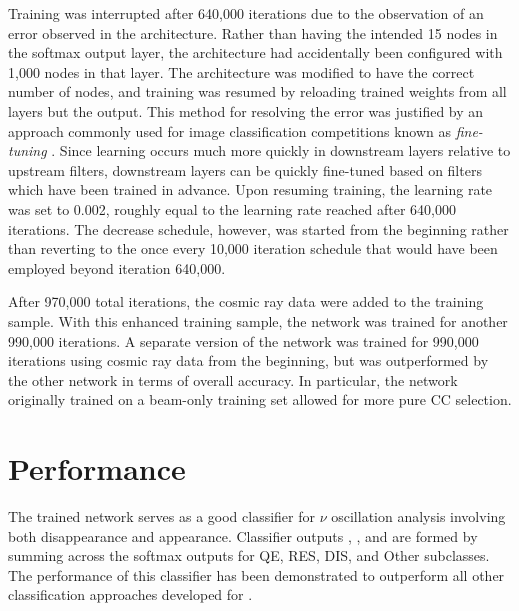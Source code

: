 Training was interrupted after 640,000 iterations due to the observation
of an error observed in the architecture.
Rather than having the intended 15 nodes in the softmax output layer,
the architecture had accidentally been configured with 1,000 nodes in that
layer.
The architecture was modified to have the correct number of nodes, and training
was resumed by reloading trained weights from all layers but the output.
This method for resolving the error was justified by an approach
commonly used for image classification competitions known as
\textit{fine-tuning} \cite{krizhevsky2012imagenet}.
Since learning occurs much more quickly in downstream layers relative to
upstream filters, downstream layers can be quickly fine-tuned based on
filters which have been trained in advance.
Upon resuming training, the learning rate was set to 0.002, roughly equal to
the learning rate reached after 640,000 iterations.
The decrease schedule, however, was started from the beginning rather
than reverting to the once every 10,000 iteration schedule
that would have been employed beyond iteration 640,000.

After 970,000 total iterations, the cosmic ray data were added to the
training sample.
With this enhanced training sample, the network was trained for another
990,000 iterations.
A separate version of the network was trained for 990,000 iterations
using cosmic ray data from the beginning, but was outperformed by the
other network in terms of overall accuracy.
In particular, the network originally trained on a beam-only training set
allowed for more pure \nue CC selection.



\section{Performance}

The trained network serves as a good classifier for $\nu$ oscillation analysis
involving both \numu disappearance and \nue appearance.
Classifier outputs \nue, \numu, and \nutau are formed by summing across the
softmax outputs for QE, RES, DIS, and Other subclasses.
The performance of this classifier has been demonstrated to outperform
all other classification approaches developed for \nova.










